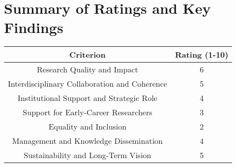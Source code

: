 \documentclass{article}
\begin{document}
\section{Summary of Ratings and Key Findings}

\begin{tabular}{|c|c|}
    \hline
    \textbf{Criterion} & \textbf{Rating (1-10)} \\
    \hline
    Research Quality and Impact & 6 \\
    Interdisciplinary Collaboration and Coherence & 5 \\
    Institutional Support and Strategic Role & 4 \\
    Support for Early-Career Researchers & 3 \\
    Equality and Inclusion & 2 \\
    Management and Knowledge Dissemination & 4 \\
    Sustainability and Long-Term Vision & 5 \\
    \hline
\end{tabular}
\end{document}
